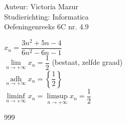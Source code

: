 \documentclass[a4paper]{article}
\begin{document}
  
\noindent \large Auteur: Victoria Mazur \\
\noindent \large Studierichting: Informatica\\
\noindent \large Oefeningenreeks 6C nr. 4.9\\

\medskip

\normalsize

$ x_n = \dfrac{3n^2 + 5n - 4}{6n^2 - 6n - 1} $ \\

$\lim\limits_{n \rightarrow +\infty} x_n = \dfrac{1}{2}$ (bestaat, zelfde graad) \\

$\mathop{\mathrm{adh}}\limits_{n \rightarrow +\infty} x_n = \left\{\dfrac{1}{2}\right\}$ \\

$\liminf\limits_{n \rightarrow +\infty} x_n = \limsup\limits_{n \rightarrow +\infty} x_n = \dfrac{1}{2}$ \\

\begin{thebibliography}{999}
\end{thebibliography}
\end{document}
